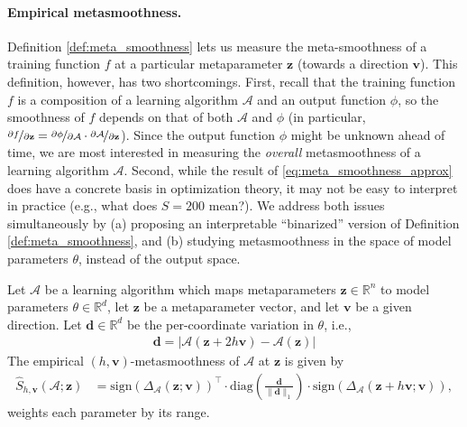 \paragraph{Empirical metasmoothness.}
Definition \ref{def:meta_smoothness} lets us measure the
meta-smoothness of a
training function $f$ at a particular metaparameter $\mathbf{z}$
(towards a direction $\mathbf{v}$).
This definition, however, has two shortcomings.
First, recall that the training function $f$ is a composition of a learning
algorithm $\mathcal{A}$ and an output function $\phi$,
so the smoothness of $f$ depends on that of both $\mathcal{A}$
and $\phi$ (in particular,
  $\nicefrac{\partial f}{\partial \mathbf{z}} = \nicefrac{\partial
  \phi}{\partial
\mathcal{A}}\cdot \nicefrac{\partial \mathcal{A}}{\partial \mathbf{z}}$).
Since the output
function $\phi$ might be unknown ahead of time, we are most interested in
measuring the {\em overall} metasmoothness of a learning algorithm
$\mathcal{A}$.
Second, while the result of \eqref{eq:meta_smoothness_approx} does have a
concrete basis in optimization theory, it may not be easy to
interpret in practice
(e.g., what does $S = 200$ mean?).
We address both issues simultaneously by
(a) proposing an interpretable ``binarized''
version of Definition \ref{def:meta_smoothness}, and
(b) studying metasmoothness in the space of model parameters $\theta$,
instead of the output space.
\begin{definition}
  \label{def:avg_meta_smoothness}
  Let $\mathcal{A}$ be a learning algorithm which maps metaparameters
  $\mathbf{z} \in \mathbb{R}^n$
  to model parameters $\theta \in \mathbb{R}^d$,
  let $\mathbf{z}$ be a metaparameter vector,
  and let $\mathbf{v}$ be a given direction.
  Let $\mathbf{d} \in \mathbb{R}^d$ be the
  per-coordinate variation in $\theta$, i.e.,
  \begin{align*}
    \mathbf{d} = |\mathcal{A}(\mathbf{z} + 2h\mathbf{v}) -
    \mathcal{A}(\mathbf{z})|  %
  \end{align*}
  The empirical $(h, \mathbf{v})$-metasmoothness of $\mathcal{A}$ at
  $\mathbf{z}$ is given by
  \begin{align}
    \label{eq:avg_meta_smoothness}
    \widehat{S}_{h, \mathbf{v}}(\mathcal{A}; \mathbf{z})
    & =
    \mathrm{sign}(\Delta_{\mathcal{A}}(\mathbf{z};\mathbf{v}))^\top\cdot
    \mathrm{diag}\left(
      \frac{\mathbf{d}}{\|\mathbf{d}\|_1}
    \right)\cdot \mathrm{sign}(\Delta_{\mathcal{A}}(\mathbf{z} +
    h\mathbf{v};\mathbf{v})),
  \end{align}
  weights each parameter by its range.
\end{definition}
